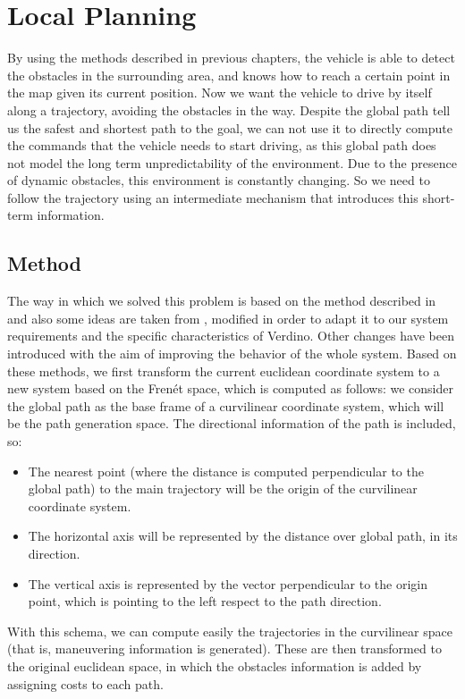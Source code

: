 
\graphicspath{{./images/chapter07/bmps/}{./images/chapter07/vects/}{./images/chapter07/}}

\chapter{Local Planning}\label{ch:chapter07}

By using the methods described in previous chapters, the vehicle is able to detect the obstacles in the surrounding area, and knows how to reach a certain point in the map given its current position. Now we want the vehicle to drive by itself along a trajectory, avoiding the obstacles in the way.
Despite the global path tell us the safest and shortest path to the goal, we can not use it to directly compute the commands that the vehicle needs to start driving, as this global path does not model the long term unpredictability of the environment. Due to the presence of dynamic obstacles, this environment is constantly changing. So we need to follow the trajectory using an intermediate mechanism that introduces this short-term information.

\section{Method}\label{ch:chapter07_01}

The way in which we solved this problem is based on the method described in \cite{chu2012local} and also some ideas are taken from \cite{thrun2006stanley}, modified in order to adapt it to our system requirements and the specific characteristics of Verdino. Other changes have been introduced with the aim of improving the behavior of the whole system. Based on these methods, we first transform the current euclidean coordinate system to a new system based on the Frenét space, which is computed as follows: we consider the global path  as the base frame of a curvilinear coordinate system, which will be the path generation space. The directional information of the path is included, so:
\begin{itemize}
 \item The nearest point (where the distance is computed perpendicular to the global path) to the main trajectory will be the origin of the curvilinear coordinate system.
 \item The horizontal axis will be represented by the distance over global path, in its direction.
 \item The vertical axis is represented by the vector perpendicular to the origin point, which is pointing to the left respect to the path direction.
\end{itemize}
With this schema, we can compute easily the trajectories in the curvilinear space (that is, maneuvering information is generated). These are then transformed to the original euclidean space, in which the obstacles information is added by assigning costs to each path.

